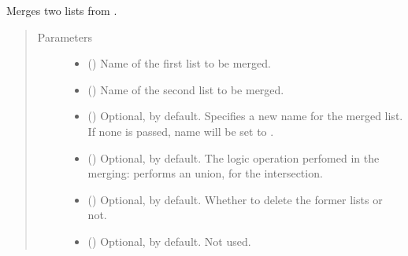 \documentclass[letterpaper,10pt,english]{sphinxmanual}
\begin{document}
\begin{fulllineitems}
\begin{fulllineitems}
\begin{quote}
\begin{description}
\end{description}\end{quote}

\end{fulllineitems}


\begin{fulllineitems}
\label{\detokenize{main:pypath.main.PyPath.merge_lists}}
Merges two lists from .
\begin{quote}\begin{description}
\item[{Parameters}] \leavevmode\begin{itemize}
\item {} 
 () \textendash{} Name of the first list to be merged.

\item {} 
 () \textendash{} Name of the second list to be merged.

\item {} 
 () \textendash{} Optional,  by default. Specifies a new name for the
merged list. If none is passed, name will be set to
.

\item {} 
 () \textendash{} Optional,  by default. The logic operation perfomed
in the merging:  performs an union,  for
the intersection.

\item {} 
 () \textendash{} Optional,  by default. Whether to delete the
former lists or not.

\item {} 
 () \textendash{} Optional,  by default. Not used.


\end{itemize}
\end{description}
\end{quote}
\end{fulllineitems}
\end{fulllineitems}
\end{document}
